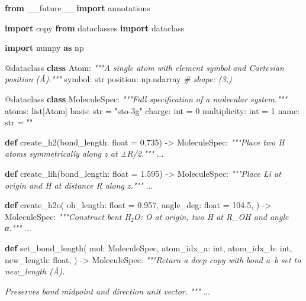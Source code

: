 \documentclass[
  11pt,
]{report}
\newenvironment{Shaded}{}{}
\newcommand{\AttributeTok}[1]{\textcolor[rgb]{0.49,0.56,0.16}{#1}}
\newcommand{\BuiltInTok}[1]{\textcolor[rgb]{0.00,0.50,0.00}{#1}}
\newcommand{\CommentTok}[1]{\textcolor[rgb]{0.38,0.63,0.69}{\textit{#1}}}
\newcommand{\DecValTok}[1]{\textcolor[rgb]{0.25,0.63,0.44}{#1}}
\newcommand{\FloatTok}[1]{\textcolor[rgb]{0.25,0.63,0.44}{#1}}
\newcommand{\ImportTok}[1]{\textcolor[rgb]{0.00,0.50,0.00}{\textbf{#1}}}
\newcommand{\KeywordTok}[1]{\textcolor[rgb]{0.00,0.44,0.13}{\textbf{#1}}}
\newcommand{\NormalTok}[1]{#1}
\newcommand{\OperatorTok}[1]{\textcolor[rgb]{0.40,0.40,0.40}{#1}}
\newcommand{\StringTok}[1]{\textcolor[rgb]{0.25,0.44,0.63}{#1}}
\begin{document}
\begin{Shaded}
\begin{Highlighting}[]
\ImportTok{from}\NormalTok{ \_\_future\_\_ }\ImportTok{import}\NormalTok{ annotations}

\ImportTok{import}\NormalTok{ copy}
\ImportTok{from}\NormalTok{ dataclasses }\ImportTok{import}\NormalTok{ dataclass}

\ImportTok{import}\NormalTok{ numpy }\ImportTok{as}\NormalTok{ np}


\AttributeTok{@dataclass}
\KeywordTok{class}\NormalTok{ Atom:}
    \CommentTok{"""A single atom with element symbol and Cartesian position (Å)."""}
\NormalTok{    symbol: }\BuiltInTok{str}
\NormalTok{    position: np.ndarray  }\CommentTok{\# shape: (3,)}


\AttributeTok{@dataclass}
\KeywordTok{class}\NormalTok{ MoleculeSpec:}
    \CommentTok{"""Full specification of a molecular system."""}
\NormalTok{    atoms: }\BuiltInTok{list}\NormalTok{[Atom]}
\NormalTok{    basis: }\BuiltInTok{str} \OperatorTok{=} \StringTok{"sto{-}3g"}
\NormalTok{    charge: }\BuiltInTok{int} \OperatorTok{=} \DecValTok{0}
\NormalTok{    multiplicity: }\BuiltInTok{int} \OperatorTok{=} \DecValTok{1}
\NormalTok{    name: }\BuiltInTok{str} \OperatorTok{=} \StringTok{""}


\KeywordTok{def}\NormalTok{ create\_h2(bond\_length: }\BuiltInTok{float} \OperatorTok{=} \FloatTok{0.735}\NormalTok{) }\OperatorTok{{-}\textgreater{}}\NormalTok{ MoleculeSpec:}
    \CommentTok{"""Place two H atoms symmetrically along z at ±R/2."""}
\NormalTok{    ...}


\KeywordTok{def}\NormalTok{ create\_lih(bond\_length: }\BuiltInTok{float} \OperatorTok{=} \FloatTok{1.595}\NormalTok{) }\OperatorTok{{-}\textgreater{}}\NormalTok{ MoleculeSpec:}
    \CommentTok{"""Place Li at origin and H at distance R along z."""}
\NormalTok{    ...}


\KeywordTok{def}\NormalTok{ create\_h2o(}
\NormalTok{    oh\_length: }\BuiltInTok{float} \OperatorTok{=} \FloatTok{0.957}\NormalTok{,}
\NormalTok{    angle\_deg: }\BuiltInTok{float} \OperatorTok{=} \FloatTok{104.5}\NormalTok{,}
\NormalTok{) }\OperatorTok{{-}\textgreater{}}\NormalTok{ MoleculeSpec:}
    \CommentTok{"""Construct bent H₂O: O at origin, two H at R\_OH and angle α."""}
\NormalTok{    ...}


\KeywordTok{def}\NormalTok{ set\_bond\_length(}
\NormalTok{    mol: MoleculeSpec,}
\NormalTok{    atom\_idx\_a: }\BuiltInTok{int}\NormalTok{,}
\NormalTok{    atom\_idx\_b: }\BuiltInTok{int}\NormalTok{,}
\NormalTok{    new\_length: }\BuiltInTok{float}\NormalTok{,}
\NormalTok{) }\OperatorTok{{-}\textgreater{}}\NormalTok{ MoleculeSpec:}
    \CommentTok{"""Return a deep copy with bond a–b set to new\_length (Å).}

\CommentTok{    Preserves bond midpoint and direction unit vector.}
\CommentTok{    """}
\NormalTok{    ...}
\end{Highlighting}
\end{Shaded}
\end{document}
